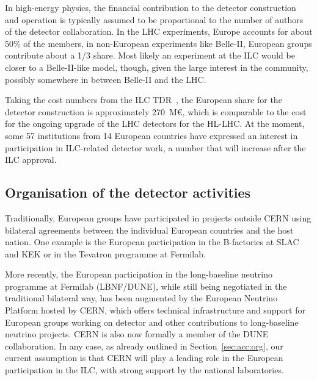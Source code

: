 \documentclass[%
 reprint,
 floatfix,
 amsmath,amssymb,
 aps,
]{revtex4-1}
\begin{document}
In high-energy physics, the financial contribution to the detector
construction and operation is typically assumed to be proportional to the number of authors of
the detector collaboration. In the LHC experiments, Europe accounts for about 50\% of the members, 
in non-European experiments like Belle-II, European groups contribute about a 1/3 share. Most likely 
an experiment at the ILC would be closer to a Belle-II-like model, though, given the large interest 
in the community, possibly somewhere in between Belle-II and the LHC. 

Taking the cost numbers from the ILC TDR~\cite{Behnke:2013lya}, the European share for the detector construction 
is approximately 270~M\euro{}, which is comparable to the cost for the ongoing upgrade of the LHC detectors for the HL-LHC. 
At the moment, some 57 institutions from 14 European countries have expressed 
an interest in participation in ILC-related detector work, a number that will increase after the ILC approval.

\subsection{\label{sec:det:Organisation} Organisation of the detector activities}
Traditionally, European groups have participated in projects outside CERN using bilateral agreements between the individual 
European countries and the host nation. One example is the European 
participation in the B-factories at SLAC and KEK or in the Tevatron programme at 
Fermilab.

More recently, the European participation in the long-baseline neutrino 
programme at Fermilab (LBNF/DUNE), while still being negotiated in the 
traditional bilateral way, has been augmented by the European Neutrino Platform 
hosted by CERN, which offers technical infrastructure and support for European 
groups working on detector and other contributions to long-baseline neutrino 
projects. CERN is also now formally a member of the DUNE collaboration.
In any case, as already outlined in Section~\ref{sec:acc:org}, our current assumption is that 
CERN will play a leading role in the European participation in the ILC, with strong support by the national laboratories.
\end{document}
